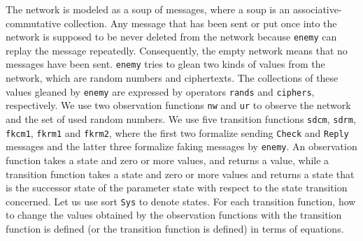 \documentclass[a4paper,fleqn]{cas-dc}
\begin{document}
The network is modeled as a soup of messages, where a soup is an associative-commutative collection. Any message that has been sent or put once into the network is supposed to be never deleted from the network because \verb!enemy! can replay the message repeatedly. Consequently, the empty network means that no messages have been sent. \verb!enemy! tries to glean two kinds of values from the network, which are random numbers and ciphertexts. The collections of these values gleaned by \verb!enemy! are expressed by operators \verb!rands! and \verb!ciphers!, respectively.
We use two observation functions \verb!nw! and \verb!ur! to observe the network and the set of used random numbers.
We use five transition functions \verb!sdcm!, \verb!sdrm!, \verb!fkcm1!, \verb!fkrm1! and \verb!fkrm2!, where the first two formalize sending \verb!Check! and \verb!Reply! messages and the latter three formalize faking messages by \verb!enemy!. An observation function takes a state and zero or more values, and returns a value, while a transition function takes a state and zero or more values and returns a state that is the successor state of the parameter state with respect to the state transition concerned. Let us use sort \verb!Sys! to denote states. For each transition function, how to change the values obtained by the observation functions with the transition function is defined (or the transition function is defined) in terms of equations. 
\end{document}
